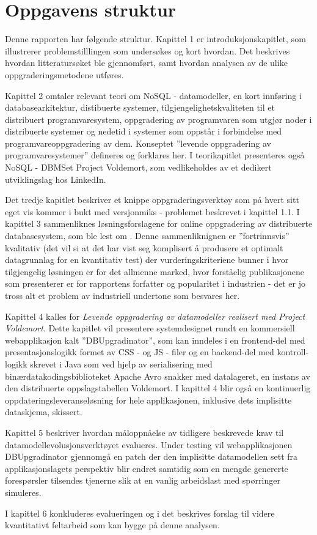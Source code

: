 \section{Oppgavens struktur}

Denne rapporten har følgende struktur. Kapittel 1 er introduksjonskapitlet, som illustrerer problemstilllingen som undersøkes og kort hvordan. Det beskrives hvordan litteratursøket ble gjennomført, samt hvordan analysen av de ulike oppgraderingsmetodene utføres.

Kapittel 2 omtaler relevant teori om NoSQL - datamodeller, en kort innføring i databasearkitektur, distibuerte systemer, tilgjengelighetskvaliteten til et distribuert programvaresystem, oppgradering av programvaren som utgjør noder i distribuerte systemer og nedetid i systemer som oppstår i forbindelse med programvareoppgradering av dem. Konseptet ''levende oppgradering av programvaresystemer'' defineres og forklares her. I teorikapitlet presenteres også NoSQL - DBMSet Project Voldemort, som vedlikeholdes av et dedikert utviklingslag hos LinkedIn.

Det tredje kapitlet beskriver et knippe oppgraderingsverktøy som på hvert sitt eget vis kommer i bukt med versjonmiks - problemet beskrevet i kapittel 1.1. I kapittel 3 sammenliknes løsningsforslagene for online oppgradering av distribuerte databasesystem, som ble lest om . Denne sammenliknignen er ''fortrinnsvis'' kvalitativ (det vil si at det har vist seg komplisert å produsere et optimalt datagrunnlag for en kvantitativ test) der vurderingskriteriene bunner i hvor tilgjengelig løsningen er for det allmenne marked, hvor forståelig publikasjonene som presenterer er for rapportens forfatter og popularitet i industrien - det er jo tross alt et problem av industriell undertone som besvares her.

Kapittel 4 kalles for \emph{Levende oppgradering av datamodeller realisert med Project Voldemort}. Dette kapitlet vil presentere systemdesignet rundt en kommersiell webapplikasjon kalt ''DBUpgradinator'', som kan inndeles i en frontend-del med presentasjonslogikk formet av CSS - og JS - filer og en backend-del med kontroll-logikk skrevet i Java som ved hjelp av serialisering med binærdatakodingsbiblioteket Apache Avro snakker med datalageret, en instans av den distribuerte oppslagstabellen Voldemort. I kapittel 4 blir også en kontinuerlig oppdateringsleveranseløsning for hele applikasjonen, inklusive dets implisitte dataskjema, skissert.

Kapittel 5 beskriver hvordan måloppnåelse av tidligere beskrevede krav til datamodellevolusjonsverktøyet evalueres. Under testing vil webapplikasjonen DBUpgradinator gjennomgå en patch der den implisitte datamodellen sett fra applikasjonslagets perspektiv blir endret samtidig som en mengde genererte forespørsler tilsendes tjenerne slik at en vanlig arbeidslast med spørringer simuleres.

I kapittel 6 konkluderes evalueringen og i det beskrives forslag til videre kvantitativt feltarbeid som kan bygge på denne analysen.
